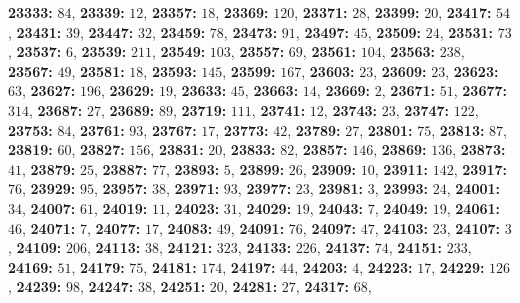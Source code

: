 \textsf{\bfseries 23333:} $84$, \textsf{\bfseries 23339:} $12$, \textsf{\bfseries 23357:} $18$, \textsf{\bfseries 23369:} $120$, \textsf{\bfseries 23371:} $28$, \textsf{\bfseries 23399:} $20$, \textsf{\bfseries 23417:} $54$, \textsf{\bfseries 23431:} $39$, \textsf{\bfseries 23447:} $32$, \textsf{\bfseries 23459:} $78$, \textsf{\bfseries 23473:} $91$, \textsf{\bfseries 23497:} $45$, \textsf{\bfseries 23509:} $24$, \textsf{\bfseries 23531:} $73$, \textsf{\bfseries 23537:} $6$, \textsf{\bfseries 23539:} $211$, \textsf{\bfseries 23549:} $103$, \textsf{\bfseries 23557:} $69$, \textsf{\bfseries 23561:} $104$, \textsf{\bfseries 23563:} $238$, \textsf{\bfseries 23567:} $49$, \textsf{\bfseries 23581:} $18$, \textsf{\bfseries 23593:} $145$, \textsf{\bfseries 23599:} $167$, \textsf{\bfseries 23603:} $23$, \textsf{\bfseries 23609:} $23$, \textsf{\bfseries 23623:} $63$, \textsf{\bfseries 23627:} $196$, \textsf{\bfseries 23629:} $19$, \textsf{\bfseries 23633:} $45$, \textsf{\bfseries 23663:} $14$, \textsf{\bfseries 23669:} $2$, \textsf{\bfseries 23671:} $51$, \textsf{\bfseries 23677:} $314$, \textsf{\bfseries 23687:} $27$, \textsf{\bfseries 23689:} $89$, \textsf{\bfseries 23719:} $111$, \textsf{\bfseries 23741:} $12$, \textsf{\bfseries 23743:} $23$, \textsf{\bfseries 23747:} $122$, \textsf{\bfseries 23753:} $84$, \textsf{\bfseries 23761:} $93$, \textsf{\bfseries 23767:} $17$, \textsf{\bfseries 23773:} $42$, \textsf{\bfseries 23789:} $27$, \textsf{\bfseries 23801:} $75$, \textsf{\bfseries 23813:} $87$, \textsf{\bfseries 23819:} $60$, \textsf{\bfseries 23827:} $156$, \textsf{\bfseries 23831:} $20$, \textsf{\bfseries 23833:} $82$, \textsf{\bfseries 23857:} $146$, \textsf{\bfseries 23869:} $136$, \textsf{\bfseries 23873:} $41$, \textsf{\bfseries 23879:} $25$, \textsf{\bfseries 23887:} $77$, \textsf{\bfseries 23893:} $5$, \textsf{\bfseries 23899:} $26$, \textsf{\bfseries 23909:} $10$, \textsf{\bfseries 23911:} $142$, \textsf{\bfseries 23917:} $76$, \textsf{\bfseries 23929:} $95$, \textsf{\bfseries 23957:} $38$, \textsf{\bfseries 23971:} $93$, \textsf{\bfseries 23977:} $23$, \textsf{\bfseries 23981:} $3$, \textsf{\bfseries 23993:} $24$, \textsf{\bfseries 24001:} $34$, \textsf{\bfseries 24007:} $61$, \textsf{\bfseries 24019:} $11$, \textsf{\bfseries 24023:} $31$, \textsf{\bfseries 24029:} $19$, \textsf{\bfseries 24043:} $7$, \textsf{\bfseries 24049:} $19$, \textsf{\bfseries 24061:} $46$, \textsf{\bfseries 24071:} $7$, \textsf{\bfseries 24077:} $17$, \textsf{\bfseries 24083:} $49$, \textsf{\bfseries 24091:} $76$, \textsf{\bfseries 24097:} $47$, \textsf{\bfseries 24103:} $23$, \textsf{\bfseries 24107:} $3$, \textsf{\bfseries 24109:} $206$, \textsf{\bfseries 24113:} $38$, \textsf{\bfseries 24121:} $323$, \textsf{\bfseries 24133:} $226$, \textsf{\bfseries 24137:} $74$, \textsf{\bfseries 24151:} $233$, \textsf{\bfseries 24169:} $51$, \textsf{\bfseries 24179:} $75$, \textsf{\bfseries 24181:} $174$, \textsf{\bfseries 24197:} $44$, \textsf{\bfseries 24203:} $4$, \textsf{\bfseries 24223:} $17$, \textsf{\bfseries 24229:} $126$, \textsf{\bfseries 24239:} $98$, \textsf{\bfseries 24247:} $38$, \textsf{\bfseries 24251:} $20$, \textsf{\bfseries 24281:} $27$, \textsf{\bfseries 24317:} $68$, 
